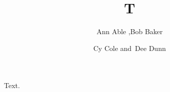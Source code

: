 \documentclass{article}
\title{T}
\author{Ann Able \sep Bob Baker}
\affil{Univ X}
\author{Cy Cole \csname and\endcsname\ Dee Dunn}
\affil{Univ Y}
\begin{document}
\maketitle
Text.
\end{document}
